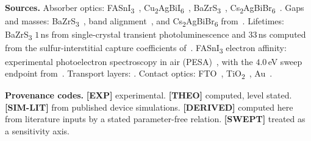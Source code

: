 \documentclass[lettersize,journal,onecolumn]{IEEEtran}
\newcommand{\FASnI}{FASnI\textsubscript{3}}
\newcommand{\CABI}{Cu\textsubscript{2}AgBiI\textsubscript{6}}
\newcommand{\BZS}{BaZrS\textsubscript{3}}
\newcommand{\CABB}{Cs\textsubscript{2}AgBiBr\textsubscript{6}}
\newcommand{\TiOx}{TiO\textsubscript{2}}
\begin{document}
\textbf{Sources.} Absorber optics: \FASnI~\cite{ghimire2017},
\CABI~\cite{kamppinen2026,sansom2021}, \BZS~\cite{nishigaki2020},
\CABB~\cite{eddekkar2024}. Gaps and masses: \BZS~\cite{kumar2021}, band
alignment~\cite{eya_dzade}, and \CABB{} from~\cite{eddekkar2024,filip2016}. Lifetimes:
\BZS{} $1$\,ns from single-crystal transient photoluminescence
\cite{nielsen2025} and $33$\,ns computed from the sulfur-interstitial
capture coefficients of~\cite{yuan2024}. \FASnI{} electron affinity:
experimental photoelectron spectroscopy in air (PESA)~\cite{wu2022chi}, with
the $4.0$\,eV sweep endpoint from~\cite{scaps_fasni3}. Transport layers:
\cite{rahman2023,usman2024}. Contact optics: FTO~\cite{vonrottkay1996},
\TiOx~\cite{devore1951}, Au~\cite{mcpeak2015}.

\textbf{Provenance codes.} \textbf{[EXP]} experimental. \textbf{[THEO]}
computed, level stated. \textbf{[SIM-LIT]} from published device simulations.
\textbf{[DERIVED]} computed here from literature inputs by a stated
parameter-free relation. \textbf{[SWEPT]} treated as a sensitivity axis.
\end{document}
